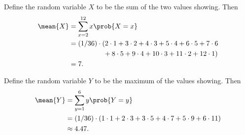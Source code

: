 Define the random variable $X$ to be the sum of the two values showing.
Then
\begin{align*}
    \mean{X} &= \sum_{x=2}^{12}x\prob{X=x} \\
    &= (1/36)\cdot(2\cdot1+3\cdot2+4\cdot3+5\cdot4+6\cdot5+7\cdot6 \\
    &\quad\quad\quad\quad\quad {}+8\cdot5+9\cdot4+10\cdot3+11\cdot2+12\cdot1) \\
    &= 7.
\end{align*}

Define the random variable $Y$ to be the maximum of the values showing.
Then
\begin{align*}
    \mean{Y} &= \sum_{y=1}^{6}y\prob{Y=y} \\
    &= (1/36)\cdot(1\cdot1+2\cdot3+3\cdot5+4\cdot7+5\cdot9+6\cdot11) \\
    &\approx 4.47.
\end{align*}
